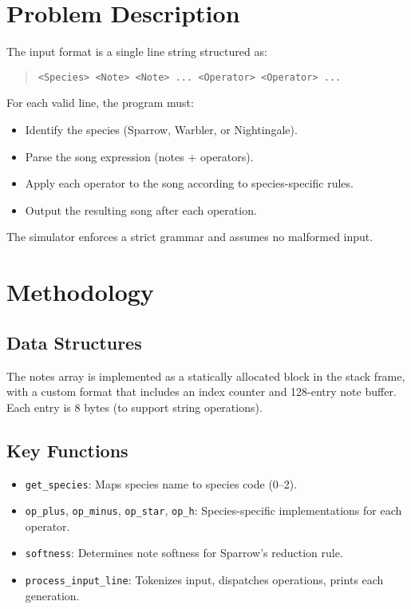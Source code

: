 \documentclass[11pt]{article}
\begin{document}
\section{Problem Description}
The input format is a single line string structured as:
\begin{quote}
\texttt{<Species> <Note> <Note> ... <Operator> <Operator> ...}
\end{quote}

For each valid line, the program must:
\begin{itemize}[noitemsep]
    \item Identify the species (Sparrow, Warbler, or Nightingale).
    \item Parse the song expression (notes + operators).
    \item Apply each operator to the song according to species-specific rules.
    \item Output the resulting song after each operation.
\end{itemize}

The simulator enforces a strict grammar and assumes no malformed input.

\section{Methodology}
\subsection{Data Structures}
The notes array is implemented as a statically allocated block in the stack frame, with a custom format that includes an index counter and 128-entry note buffer. Each entry is 8 bytes (to support string operations).

\subsection{Key Functions}
\begin{itemize}[noitemsep]
    \item \texttt{get\_species}: Maps species name to species code (0--2).
    \item \texttt{op\_plus}, \texttt{op\_minus}, \texttt{op\_star}, \texttt{op\_h}: Species-specific implementations for each operator.
    \item \texttt{softness}: Determines note softness for Sparrow's reduction rule.
    \item \texttt{process\_input\_line}: Tokenizes input, dispatches operations, prints each generation.
\end{itemize}
\end{document}
